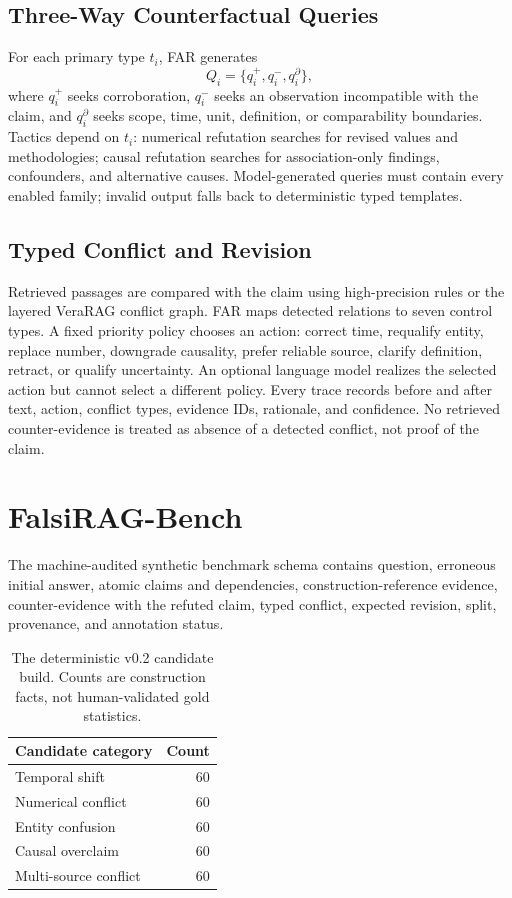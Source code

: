\documentclass[letterpaper]{article}
\begin{document}
\subsection{Three-Way Counterfactual Queries}
For each primary type $t_i$, FAR generates
\begin{equation}
Q_i=\{q_i^{+},q_i^{-},q_i^{\partial}\},
\end{equation}
where $q_i^{+}$ seeks corroboration, $q_i^{-}$ seeks an observation incompatible with the claim, and $q_i^{\partial}$ seeks scope, time, unit, definition, or comparability boundaries. Tactics depend on $t_i$: numerical refutation searches for revised values and methodologies; causal refutation searches for association-only findings, confounders, and alternative causes. Model-generated queries must contain every enabled family; invalid output falls back to deterministic typed templates.

\subsection{Typed Conflict and Revision}
Retrieved passages are compared with the claim using high-precision rules or the layered VeraRAG conflict graph. FAR maps detected relations to seven control types. A fixed priority policy chooses an action: correct time, requalify entity, replace number, downgrade causality, prefer reliable source, clarify definition, retract, or qualify uncertainty. An optional language model realizes the selected action but cannot select a different policy. Every trace records before and after text, action, conflict types, evidence IDs, rationale, and confidence. No retrieved counter-evidence is treated as absence of a detected conflict, not proof of the claim.

\section{FalsiRAG-Bench}
The machine-audited synthetic benchmark schema contains question, erroneous initial answer, atomic claims and dependencies, construction-reference evidence, counter-evidence with the refuted claim, typed conflict, expected revision, split, provenance, and annotation status.

\begin{table}[t]
\centering
\small
\begin{tabular}{lr}
\toprule
Candidate category & Count \\
\midrule
Temporal shift & 60 \\
Numerical conflict & 60 \\
Entity confusion & 60 \\
Causal overclaim & 60 \\
Multi-source conflict & 60 \\
\bottomrule
\end{tabular}
\caption{The deterministic v0.2 candidate build. Counts are construction facts, not human-validated gold statistics.}
\label{tab:data}
\end{table}
\end{document}
